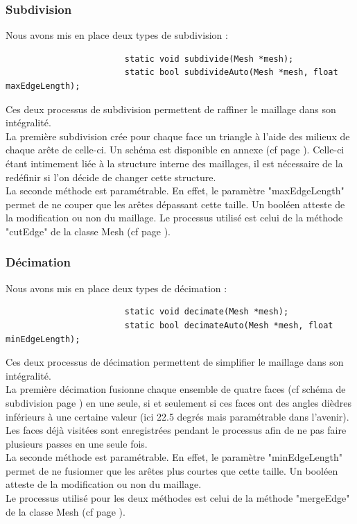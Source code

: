 \documentclass[a4paper]{memoir}
\begin{document}
				\subsubsection{Subdivision}
					Nous avons mis en place deux types de subdivision :
					\begin{verbatim}
						static void subdivide(Mesh *mesh);
						static bool subdivideAuto(Mesh *mesh, float maxEdgeLength);
					\end{verbatim}
					Ces deux processus de subdivision permettent de raffiner le maillage dans son intégralité.\\
					La première subdivision crée pour chaque face un triangle à l'aide des milieux de chaque arête de celle-ci. Un schéma est disponible en 
					annexe (cf page \pageref{fig:subdivide}). Celle-ci étant intimement liée à la structure interne des maillages, il est nécessaire de la 
					redéfinir si l'on décide de changer cette structure.\\
					La seconde méthode est paramétrable. En effet, le paramètre "maxEdgeLength" permet de ne couper que les arêtes dépassant cette taille. 
					Un booléen atteste de la modification ou non du maillage. Le processus utilisé est celui de la méthode "cutEdge" de la classe Mesh (cf 
					page \pageref{mesh-dev}).
					
				\subsubsection{Décimation}
					Nous avons mis en place deux types de décimation :
					\begin{verbatim}
						static void decimate(Mesh *mesh);
						static bool decimateAuto(Mesh *mesh, float minEdgeLength);
					\end{verbatim}
					Ces deux processus de décimation permettent de simplifier le maillage dans son intégralité.\\
					La première décimation fusionne chaque ensemble de quatre faces (cf schéma de subdivision page \pageref{fig:subdivide}) en une seule, si 
					et seulement si ces faces ont des angles dièdres inférieurs à une certaine valeur (ici 22.5 degrés mais paramétrable dans l'avenir). Les 
					faces déjà visitées sont enregistrées pendant le processus afin de ne pas faire plusieurs passes en une seule fois.\\
					La seconde méthode est paramétrable. En effet, le paramètre "minEdgeLength" permet de ne fusionner que les arêtes plus courtes que cette 
					taille. Un booléen atteste de la modification ou non du maillage.\\
					Le processus utilisé pour les deux méthodes est celui de la méthode "mergeEdge" de la classe Mesh (cf page \pageref{mesh-dev}).
				
\end{document}
